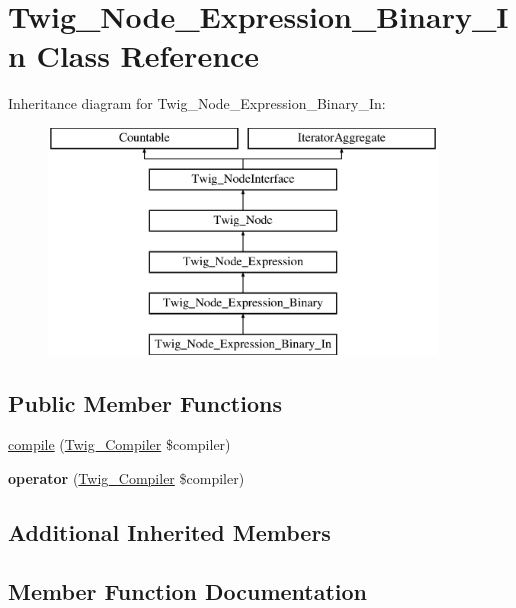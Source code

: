 \hypertarget{classTwig__Node__Expression__Binary__In}{}\section{Twig\+\_\+\+Node\+\_\+\+Expression\+\_\+\+Binary\+\_\+\+In Class Reference}
\label{classTwig__Node__Expression__Binary__In}
Inheritance diagram for Twig\+\_\+\+Node\+\_\+\+Expression\+\_\+\+Binary\+\_\+\+In\+:\begin{figure}[H]
\begin{center}
\leavevmode
\includegraphics[height=6.000000cm]{classTwig__Node__Expression__Binary__In}
\end{center}
\end{figure}
\subsection*{Public Member Functions}
\begin{DoxyCompactItemize}
\item 
\hyperlink{classTwig__Node__Expression__Binary__In_a963e1be6a7cdca12c7b6bec084bc7003}{compile} (\hyperlink{classTwig__Compiler}{Twig\+\_\+\+Compiler} \$compiler)
\item 
{\bfseries operator} (\hyperlink{classTwig__Compiler}{Twig\+\_\+\+Compiler} \$compiler)\hypertarget{classTwig__Node__Expression__Binary__In_a7e74f5a0392785cda768080b09d4f831}{}\label{classTwig__Node__Expression__Binary__In_a7e74f5a0392785cda768080b09d4f831}

\end{DoxyCompactItemize}
\subsection*{Additional Inherited Members}


\subsection{Member Function Documentation}
